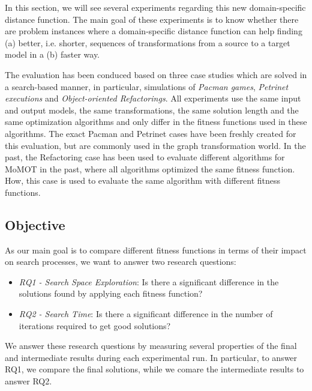 In this section, we will see several experiments regarding this new domain-specific distance function. The main goal of these experiments
is to know whether there are problem instances where a domain-specific distance function can help finding (a) better, i.e. shorter, sequences of transformations
from a source to a target model in a (b) faster way.

The evaluation has been conduced based on three case studies which are solved in a search-based manner, in particular, simulations of \textit{Pacman games}, \textit{Petrinet executions} and \textit{Object-oriented Refactorings}. All experiments use the same input and output models, the same transformations, the same solution length and the 
same optimization algorithms and only differ in the fitness functions used in these algorithms. 
The exact Pacman and Petrinet cases have been freshly created for this evaluation, but are commonly used in the graph transformation world.
In the past, the Refactoring case has been used to evaluate different algorithms for MoMOT in the past, where all algorithms optimized the same fitness function. How, this case is used to evaluate the same algorithm with different fitness functions.


\subsection{Objective}

As our main goal is to compare different fitness functions in terms of their impact on search processes, we want to answer two research questions:

\begin{itemize}
	\item \textit{RQ1 - Search Space Exploration}: Is there a significant difference in the solutions found by applying each fitness function?
	\item \textit{RQ2 - Search Time}: Is there a significant difference in the number of iterations required to get good solutions?
\end{itemize}

We answer these research questions by measuring several properties of the final and intermediate results during each experimental run.
In particular, to answer RQ1, we compare the final solutions, while we comare the intermediate results to answer RQ2.

